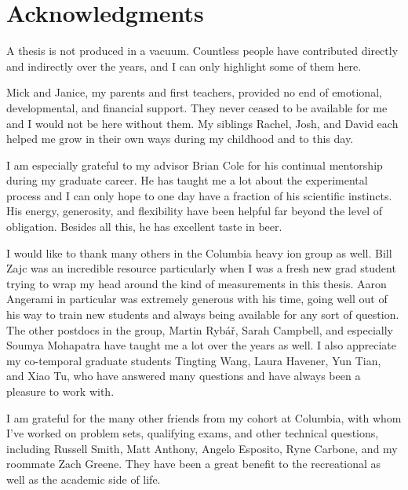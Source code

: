 \chapter{Acknowledgments} %

A thesis is not produced in a vacuum.
Countless people have contributed directly and indirectly over the years, and I can only highlight some of them here.

Mick and Janice, my parents and first teachers, provided no end of emotional, developmental, and financial support.
They never ceased to be available for me and I would not be here without them.
My siblings Rachel, Josh, and David each helped me grow in their own ways during my childhood and to this day.

I am especially grateful to my advisor Brian Cole for his continual mentorship during my graduate career.
He has taught me a lot about the experimental process and I can only hope to one day have a fraction of his scientific instincts.
His energy, generosity, and flexibility have been helpful far beyond the level of obligation.
Besides all this, he has excellent taste in beer.

I would like to thank many others in the Columbia heavy ion group as well.
Bill Zajc was an incredible resource particularly when I was a fresh new grad student trying to wrap my head around the kind of measurements in this thesis.
Aaron Angerami in particular was extremely generous with his time, going well out of his way to train new students and always being available for any sort of question.
The other postdocs in the group, Martin Ryb\'a\v{r}, Sarah Campbell, and especially Soumya Mohapatra have taught me a lot over the years as well.
I also appreciate my co-temporal graduate students Tingting Wang, Laura Havener, Yun Tian, and Xiao Tu, who have answered many questions and have always been a pleasure to work with.

I am grateful for the many other friends from my cohort at Columbia, with whom I've worked on problem sets, qualifying exams, and other technical questions, including Russell Smith, Matt Anthony, Angelo Esposito, Ryne Carbone, and my roommate Zach Greene.
They have been a great benefit to the recreational as well as the academic side of life.

